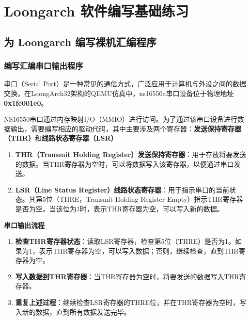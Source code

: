 \section{Loongarch 软件编写基础练习}\label{sec:02-software-preparation-004}

\subsection{为 Loongarch 编写裸机汇编程序}\label{sec:02-software-preparation-005}

\subsubsection{编写汇编串口输出程序}\label{sec:02-software-preparation-006}

串口（Serial Port）是一种常见的通信方式，广泛应用于计算机与外设之间的数据交换。在LoongArch32架构的QEMU仿真中，ns16550a串口设备位于物理地址\textbf{0x1fe001e0}。

NS16550串口通过内存映射I/O（MMIO）进行访问。为了通过该串口设备进行数据输出，需要编写相应的驱动代码，其中主要涉及两个寄存器：\textbf{发送保持寄存器（THR）}和\textbf{线路状态寄存器（LSR）}

\begin{enumerate}
\def\labelenumi{\arabic{enumi}.}
\item
  \textbf{THR（Transmit Holding Register）发送保持寄存器}：用于存放将要发送的数据。当THR寄存器为空时，可以将数据写入该寄存器，以便通过串口发送。
\item
  \textbf{LSR（Line Status Register）线路状态寄存器}：用于指示串口的当前状态。其第5位（THRE，Transmit Holding Register Empty）指示THR寄存器是否为空。当该位为1时，表示THR寄存器为空，可以写入新的数据。
\end{enumerate}

\textbf{串口输出流程}

\begin{enumerate}
\def\labelenumi{\arabic{enumi}.}
\item
  \textbf{检查THR寄存器状态}：读取LSR寄存器，检查第5位（THRE）是否为1。如果为1，表示THR寄存器为空，可以写入数据；否则，继续检查，直到THR寄存器为空。
\item
  \textbf{写入数据到THR寄存器}：当THR寄存器为空时，将要发送的数据写入THR寄存器。
\item
  \textbf{重复上述过程}：继续检查LSR寄存器的THRE位，并在THR寄存器为空时，写入新的数据，直到所有数据发送完毕。
\end{enumerate}


